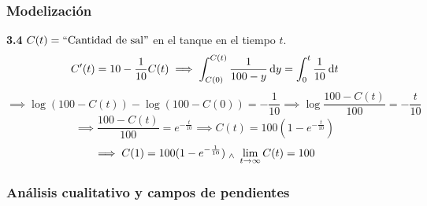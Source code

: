 \subsubsection{Modelización}

\textbf{3.4} $C(t)=\text{``Cantidad de sal''}$ en el tanque en el tiempo $t$. 
\[C'(t)=10-\frac{1}{10}C(t) \implies \int_{C(0)}^{C(t)} \frac{1}{100-y}\odif{y} = \int_{0}^{t}\frac{1}{10}\odif{t}\]
\[\implies \log{(100-C(t))} - \log{(100-C(0))}=-\frac{1}{10}\implies \log{\frac{100-C(t)}{100}}=-\frac{t}{10}\]
\[\implies \frac{100-C(t)}{100}=e^{-\frac{t}{10}}\implies C(t)=100(1-e^{-\frac{t}{10}})\]
\[\implies C(1)=100(1-e^{-\frac{1}{10}}) \; _{\wedge} \; \lim_{t\to \infty} C(t) = 100\]

\subsubsection{Análisis cualitativo y campos de pendientes}

